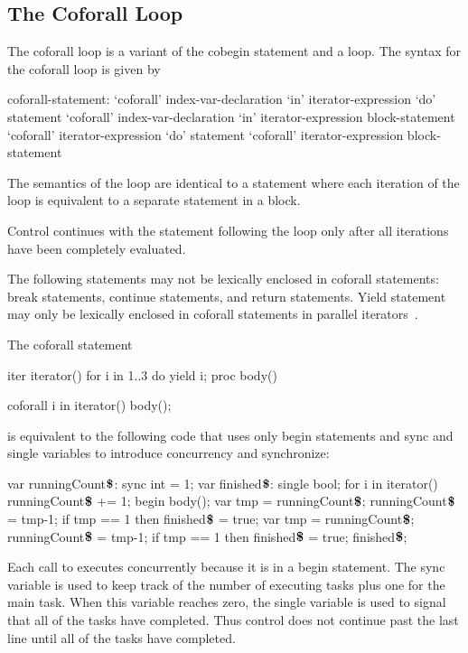 \subsection{The Coforall Loop}
\label{Coforall}

The coforall loop is a variant of the cobegin statement and a loop.
The syntax for the coforall loop is given by
\begin{syntax}
coforall-statement:
  `coforall' index-var-declaration `in' iterator-expression `do' statement
  `coforall' index-var-declaration `in' iterator-expression block-statement
  `coforall' iterator-expression `do' statement
  `coforall' iterator-expression block-statement
\end{syntax}

The semantics of the  loop are identical to
a  statement where each iteration of the 
loop is equivalent to a separate statement in a  block.

Control continues with the statement following the 
loop only after all iterations have been completely evaluated.

The following statements may not be lexically enclosed in
coforall statements: break statements, continue statements, and
return statements.  Yield statement may only be lexically enclosed in
coforall statements in parallel iterators~.

\begin{example}
The coforall statement
\begin{chapelpre}
iter iterator() { for i in 1..3 do yield i; }
proc body() { }
\end{chapelpre}
\begin{chapel}
coforall i in iterator() {
  body();
}
\end{chapel}
is equivalent to the following code that uses only begin statements
and sync and single variables to introduce concurrency and
synchronize:
\begin{chapel}
var runningCount$\mbox{{\bf \$}}$: sync int = 1;
var finished$\mbox{{\bf \$}}$: single bool;
for i in iterator() {
  runningCount$\mbox{{\bf \$}}$ += 1;
  begin {
    body();
    var tmp = runningCount$\mbox{{\bf \$}}$;
    runningCount$\mbox{{\bf \$}}$ = tmp-1;
    if tmp == 1 then finished$\mbox{{\bf \$}}$ = true;
  }
}
var tmp = runningCount$\mbox{{\bf \$}}$;
runningCount$\mbox{{\bf \$}}$ = tmp-1;
if tmp == 1 then finished$\mbox{{\bf \$}}$ = true;
finished$\mbox{{\bf \$}}$;
\end{chapel}
\begin{chapeloutput}
\end{chapeloutput}
Each call to  executes concurrently because it is in a
begin statement.  The sync
variable  is used to keep track of
the number of executing tasks plus one for the main task.  When this
variable reaches zero, the single
variable  is used to signal that all
of the tasks have completed.  Thus control does not continue past the
last line until all of the tasks have completed.
\end{example}

